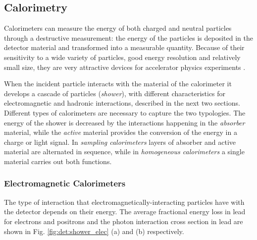 \subsection{Calorimetry}
\label{sec:dec:calo}

Calorimeters can measure the energy of both charged and neutral particles through a destructive measurement: the energy of the particles is deposited in the detector material and transformed into a measurable quantity. Because of their sensitivity to a wide variety of particles, good energy resolution and relatively small size, they are very attractive devices for accelerator physics experiments \cite{RevModPhys.75.1243} \cite{Wigmans:2000vf}.

When the incident particle interacts with the material of the calorimeter it develops a cascade of particles (\textit{shower}), with different characteristics for electromagnetic and hadronic interactions, described in the next two sections. Different types of calorimeters are necessary to capture the two typologies. The energy of the shower is decreased by the interactions happening in the \textit{absorber} material, while the \textit{active} material provides the conversion of the energy in a charge or light signal. In \textit{sampling calorimeters} layers of absorber and active material are alternated in sequence, while in \textit{homogeneous calorimeters} a single material carries out both functions.


\subsubsection{Electromagnetic Calorimeters}

The type of interaction that electromagnetically-interacting particles have with the detector depends on their energy. The average fractional energy loss in lead for electrons and positrons and the photon interaction cross section in lead are shown in Fig. \ref{fig:det:shower_elec} (a) and (b) respectively. 

